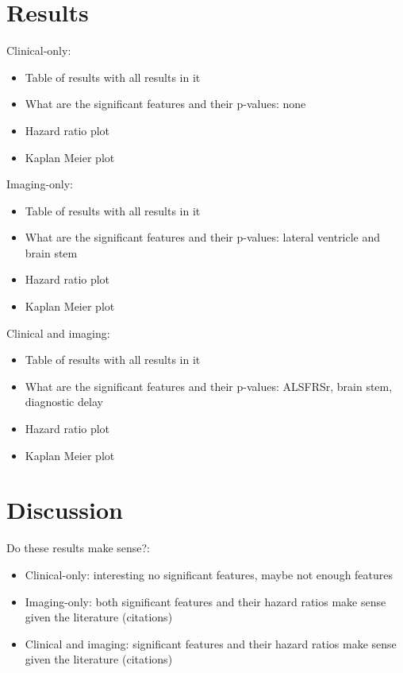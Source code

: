 \section{Results}

Clinical-only:
\begin{itemize}
    \item Table of results with all results in it
    \item What are the significant features and their p-values: none
    \item Hazard ratio plot
    \item Kaplan Meier plot
\end{itemize}

Imaging-only:
\begin{itemize}
    \item Table of results with all results in it
    \item What are the significant features and their p-values: lateral ventricle and brain stem
    \item Hazard ratio plot
    \item Kaplan Meier plot
\end{itemize}

Clinical and imaging:
\begin{itemize}
    \item Table of results with all results in it
    \item What are the significant features and their p-values: ALSFRSr, brain stem, diagnostic delay
    \item Hazard ratio plot
    \item Kaplan Meier plot
\end{itemize}

\section{Discussion}

Do these results make sense?:
\begin{itemize}
    \item Clinical-only: interesting no significant features, maybe not enough features
    \item Imaging-only: both significant features and their hazard ratios make sense given the literature (citations)
    \item Clinical and imaging: significant features and their hazard ratios make sense given the literature (citations)
\end{itemize}


